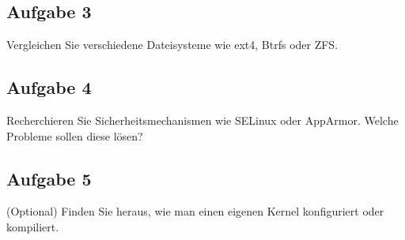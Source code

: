 \documentclass{article}
\begin{document}
    \subsection{Aufgabe 3}
    Vergleichen Sie verschiedene Dateisysteme wie ext4, Btrfs oder ZFS.

    \subsection{Aufgabe 4}
    Recherchieren Sie Sicherheitsmechanismen wie SELinux oder AppArmor.
    Welche Probleme sollen diese lösen?

    \subsection{Aufgabe 5}
    (Optional) Finden Sie heraus, wie man einen eigenen Kernel konfiguriert oder kompiliert.
\end{document}
